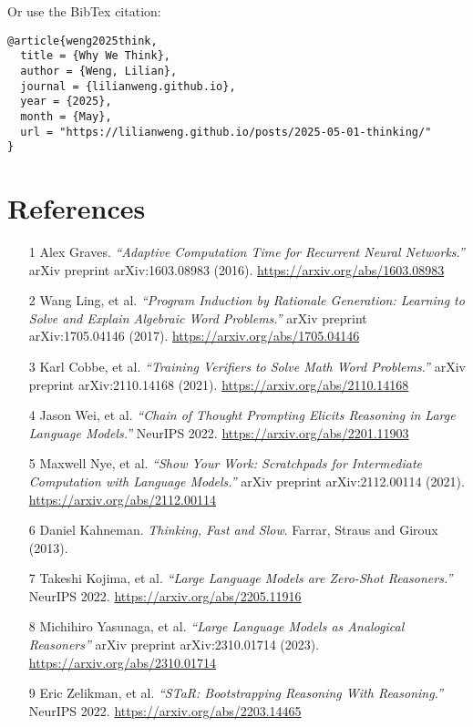 \documentclass[12pt]{article}
\begin{document}
Or use the BibTex citation:

\begin{verbatim}
@article{weng2025think,
  title = {Why We Think},
  author = {Weng, Lilian},
  journal = {lilianweng.github.io},
  year = {2025},
  month = {May},
  url = "https://lilianweng.github.io/posts/2025-05-01-thinking/"
}
\end{verbatim}

\section{References}


\begin{itemize}
    \item [1] Alex Graves. \textit{``Adaptive Computation Time for Recurrent Neural Networks.''} arXiv preprint arXiv:1603.08983 (2016). \url{https://arxiv.org/abs/1603.08983}
    \item [2] Wang Ling, et al. \textit{``Program Induction by Rationale Generation: Learning to Solve and Explain Algebraic Word Problems.''} arXiv preprint arXiv:1705.04146 (2017). \url{https://arxiv.org/abs/1705.04146}
    \item [3] Karl Cobbe, et al. \textit{``Training Verifiers to Solve Math Word Problems.''} arXiv preprint arXiv:2110.14168 (2021). \url{https://arxiv.org/abs/2110.14168}
    \item [4] Jason Wei, et al. \textit{``Chain of Thought Prompting Elicits Reasoning in Large Language Models.''} NeurIPS 2022. \url{https://arxiv.org/abs/2201.11903}
    \item [5] Maxwell Nye, et al. \textit{``Show Your Work: Scratchpads for Intermediate Computation with Language Models.''} arXiv preprint arXiv:2112.00114 (2021). \url{https://arxiv.org/abs/2112.00114}
    \item [6] Daniel Kahneman. \textit{Thinking, Fast and Slow}. Farrar, Straus and Giroux (2013).
    \item [7] Takeshi Kojima, et al. \textit{``Large Language Models are Zero-Shot Reasoners.''} NeurIPS 2022. \url{https://arxiv.org/abs/2205.11916}
    \item [8] Michihiro Yasunaga, et al. \textit{``Large Language Models as Analogical Reasoners''} arXiv preprint arXiv:2310.01714 (2023). \url{https://arxiv.org/abs/2310.01714}
    \item [9] Eric Zelikman, et al. \textit{``STaR: Bootstrapping Reasoning With Reasoning.''} NeurIPS 2022. \url{https://arxiv.org/abs/2203.14465}

\end{itemize}
\end{document}
